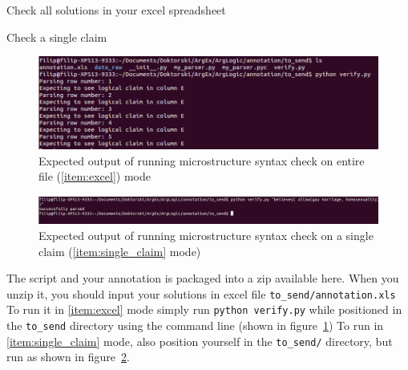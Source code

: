 \begin{description}[style=multiline, labelwidth=1.5cm]
\item[\namedlabel{item:excel}{All}] Check all solutions in your excel spreadsheet
\item[\namedlabel{item:single_claim}{Single}] Check a single claim
\end{description}

\begin{figure}
	\includegraphics[scale=0.5]{struc_instructions_1.png}
	\caption{Expected output of running microstructure syntax check on entire file (\ref{item:excel}) mode}
	\label{fig:struc_instructions_all}
\end{figure}

\begin{figure}
\includegraphics[scale=0.35]{struc_instructions_2.png}
	\caption{Expected output of running microstructure syntax check on a
	\label{fig:struc_instructions_2}
	single claim (\ref{item:single_claim} mode) }
\end{figure}

\noindent The script and your annotation is packaged into a zip available here. When you
unzip it, you should input your solutions in excel file \texttt{to\_send/annotation.xls}
To run it in \ref{item:excel} mode simply run \texttt{python verify.py} while
positioned in the \texttt{to\_send} directory using the command line (shown in
figure~\ref{fig:struc_instructions_all}) To run in \ref{item:single_claim}
mode, also position yourself in the \texttt{to\_send/} directory, but run as
shown in figure~\ref{fig:struc_instructions_2}.
